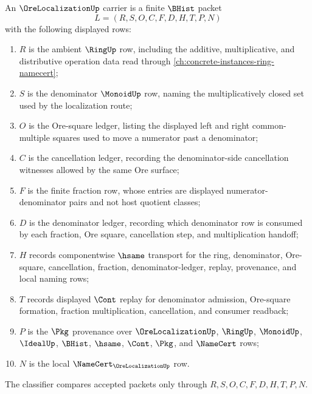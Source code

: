 \begin{definition}
\label{def:ore-localization-carrier}
An $\OreLocalizationUp$ carrier is a finite $\BHist$ packet
$$
L=(R,S,O,C,F,D,H,T,P,N)
$$
with the following displayed rows:
\begin{enumerate}
\item $R$ is the ambient $\RingUp$ row, including the additive, multiplicative, and distributive operation data read through \autoref{ch:concrete-instances-ring-namecert};
\item $S$ is the denominator $\MonoidUp$ row, naming the multiplicatively closed set used by the localization route;
\item $O$ is the Ore-square ledger, listing the displayed left and right common-multiple squares used to move a numerator past a denominator;
\item $C$ is the cancellation ledger, recording the denominator-side cancellation witnesses allowed by the same Ore surface;
\item $F$ is the finite fraction row, whose entries are displayed numerator-denominator pairs and not host quotient classes;
\item $D$ is the denominator ledger, recording which denominator row is consumed by each fraction, Ore square, cancellation step, and multiplication handoff;
\item $H$ records componentwise $\hsame$ transport for the ring, denominator, Ore-square, cancellation, fraction, denominator-ledger, replay, provenance, and local naming rows;
\item $T$ records displayed $\Cont$ replay for denominator admission, Ore-square formation, fraction multiplication, cancellation, and consumer readback;
\item $P$ is the $\Pkg$ provenance over $\OreLocalizationUp$, $\RingUp$, $\MonoidUp$, $\IdealUp$, $\BHist$, $\hsame$, $\Cont$, $\Pkg$, and $\NameCert$ rows;
\item $N$ is the local $\NameCert_{\OreLocalizationUp}$ row.
\end{enumerate}
The classifier compares accepted packets only through $R,S,O,C,F,D,H,T,P,N$.
\end{definition}

